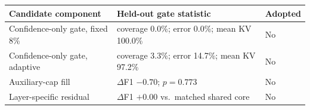 \begin{tabular}{@{}lp{}l@{}}
\toprule
Candidate component & Held-out gate statistic & Adopted \\
\midrule
Confidence-only gate, fixed 8\% & coverage 0.0\%; error 0.0\%; mean KV 100.0\% & No \\
Confidence-only gate, adaptive & coverage 3.3\%; error 14.7\%; mean KV 97.2\% & No \\
Auxiliary-cap fill & $\Delta$F1 $-0.70$; $p=0.773$ & No \\
Layer-specific residual & $\Delta$F1 $+0.00$ vs.\ matched shared core & No \\
\bottomrule
\end{tabular}
